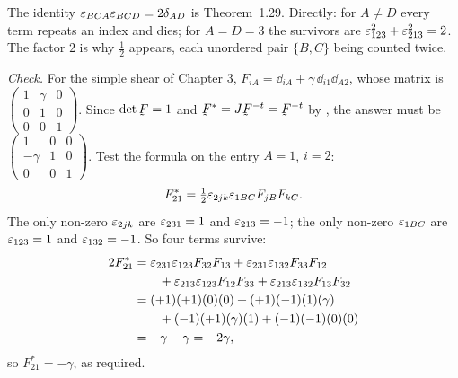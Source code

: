 The identity $\varepsilon_{BCA}\varepsilon_{BCD}=2\delta_{AD}$ is Theorem~1.29. Directly:
for $A\neq D$ every term repeats an index and dies; for $A=D=3$ the
survivors are $\varepsilon_{123}^{2}+\varepsilon_{213}^{2}=2$. The factor $2$ is why
$\tfrac12$ appears, each unordered pair $\{B,C\}$ being counted twice.

\emph{Check.} For the simple shear of Chapter 3,
$F_{iA}=\dd_{iA}+\gamma\,\dd_{i1}\dd_{A2}$, whose matrix is
$\left(\begin{smallmatrix}1&\gamma&0\\0&1&0\\0&0&1\end{smallmatrix}\right)$.
Since $\det\bF=1$ and $\bF^{*}=J\bF^{-t}=\bF^{-t}$ by , the answer
must be
$\left(\begin{smallmatrix}1&0&0\\-\gamma&1&0\\0&0&1\end{smallmatrix}\right)$.
Test the formula on the entry $A=1$, $i=2$:
\[
   F^{*}_{21}=\tfrac12\varepsilon_{2jk}\varepsilon_{1BC}F_{jB}F_{kC}.
\]
The only non-zero $\varepsilon_{2jk}$ are $\varepsilon_{231}=1$ and $\varepsilon_{213}=-1$; the
only non-zero $\varepsilon_{1BC}$ are $\varepsilon_{123}=1$ and $\varepsilon_{132}=-1$. So four
terms survive:
\[
\begin{aligned}
   2F^{*}_{21}&=\varepsilon_{231}\varepsilon_{123}F_{32}F_{13}
     +\varepsilon_{231}\varepsilon_{132}F_{33}F_{12}\\
   &\qquad+\varepsilon_{213}\varepsilon_{123}F_{12}F_{33}
     +\varepsilon_{213}\varepsilon_{132}F_{13}F_{32}\\
   &=(+1)(+1)(0)(0)+(+1)(-1)(1)(\gamma)\\
   &\qquad+(-1)(+1)(\gamma)(1)+(-1)(-1)(0)(0)\\
   &=-\gamma-\gamma=-2\gamma ,
\end{aligned}
\]
so $F^{*}_{21}=-\gamma$, as required.

